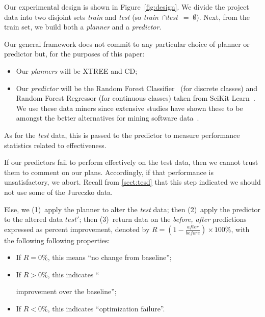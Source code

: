 \documentclass{sig-alternate}
\newcommand{\bi}{\begin{itemize}}
\newcommand{\ei}{\end{itemize}}
\newcommand{\tion}[1]{\textsection\ref{sect:#1}}
\newcommand{\fig}[1]{Figure~\ref{fig:#1}}
\begin{document}
Our experimental design is shown in \fig{design}. We divide the
project data  into two disjoint sets {\em train} and {\em test}
(so \mbox{{\em train} $\cap ${\em test} $=\;\emptyset$}).
Next, from the train set, we build both a {\em planner} and
 a {\em  predictor}. 

Our general framework does not   commit to any particular choice of { planner} or { predictor} but, for the purposes of this paper:
\bi
\item Our {\em planners} will be XTREE and CD;
\item Our  {\em predictor} will be the Random Forest Classifier~\cite{Breiman2001} (for discrete classes) and Random Forest Regressor (for continuous classes) taken from  SciKit Learn~\cite{Pedregosa2012}.   We use these
data miners since extensive studies have shown these to be amongst the better alternatives for mining software data~\cite{lessmann}.
\ei
As for the {\em test} data, this is passed to the { predictor}
to measure performance statistics related to effectiveness. 

If our { predictors} fail to perform effectively on the test data,
then we cannot trust them to comment on our plans. Accordingly,
if that performance is unsatisfactory, we abort. Recall from \tion{tesd} that this step indicated
we should not use some of the  Jureczko data.

Else, we (1)~apply the { planner} to alter the {\em test} data;
then (2)~apply the { predictor} to the altered data $test'$;
then (3)~return data on the {\em before, after} predictions expressed as percent improvement, denoted by  $R=(1-\frac{\mathit{after}}{\mathit{before}})\times100\%$, with the following following properties:
\bi
\item If $R  = 0\%$, this means  ``no change from baseline''; 
\item If $R \gt 0\%$, this indicates ``

improvement over the baseline'';
\item If $R \lt 0\%$, this indicates ``optimization failure''.
\ei
\end{document}
